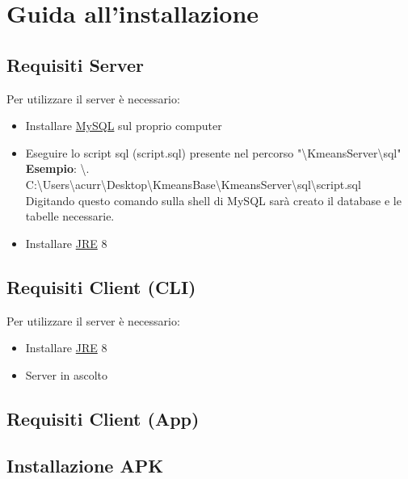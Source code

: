 \section{Guida all'installazione}
\subsection{Requisiti Server}
\noindent Per utilizzare il server è necessario:
\begin{itemize}[label=-]
  \item Installare \href{https://dev.mysql.com/downloads/installer/}{MySQL} sul proprio computer
  \item Eseguire lo script sql (script.sql) presente nel percorso "\textbackslash KmeansServer\textbackslash sql"
  \\ \textbf{Esempio}: \textbackslash . C:\textbackslash Users\textbackslash acurr\textbackslash Desktop\textbackslash KmeansBase\textbackslash KmeansServer\textbackslash sql\textbackslash script.sql
  \\ Digitando questo comando sulla shell di MySQL sarà creato il database e le tabelle necessarie.
  \item Installare \href{https://www.oracle.com/technetwork/java/javase/downloads/jre8-downloads-2133155.html}{JRE} 8  
\end{itemize}

\subsection{Requisiti Client (CLI)}
\noindent Per utilizzare il server è necessario:
\begin{itemize}[label=-]
  \item Installare \href{https://www.oracle.com/technetwork/java/javase/downloads/jre8-downloads-2133155.html}{JRE} 8  
  \item Server in ascolto
\end{itemize}

\subsection{Requisiti Client (App)}
\subsection{Installazione APK}

